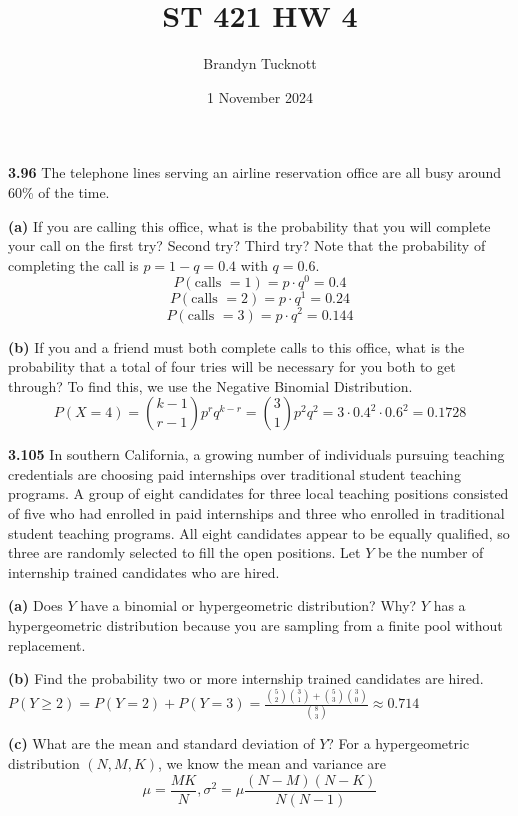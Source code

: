 \documentclass{exam}
\title{ST 421 HW 4}
\author{Brandyn Tucknott}
\date{1 November 2024}
\begin{document}
\maketitle

\begin{questions}
    \textbf{3.96 }
The telephone lines serving an airline reservation office are all busy around 60\% of the time.

\newline
\textbf{(a) } If you are calling this office, what is the probability that you will complete your call on the first try? Second try? Third try?
\sol
Note that the probability of completing the call is $p = 1 - q = 0.4$ with $q = 0.6$.
$$P(\text{calls } = 1) = p \cdot q^0 = 0.4$$
$$P(\text{calls } = 2) = p \cdot q^1 = 0.24$$
$$P(\text{calls } = 3) = p \cdot q^2 = 0.144$$

\newline
\textbf{(b) } If you and a friend must both complete calls to this office, what is the probability that a total of four tries will be necessary for you both to get through?
\sol
To find this, we use the Negative Binomial Distribution.
$$P(X = 4) = \binom{k - 1}{r - 1}p^rq^{k-r} = \binom{3}{1}p^2q^2 = 3 \cdot 0.4^2 \cdot 0.6^2 = 0.1728$$

\newpage
\textbf{3.105 }
In southern California, a growing number of individuals pursuing teaching credentials are choosing paid internships over traditional student teaching programs. A group of eight candidates for three local teaching positions consisted of five who had enrolled in paid internships and three who enrolled in traditional student teaching programs. All eight candidates appear to be equally qualified, so three are randomly selected to fill the open positions. Let $Y$ be the number of internship trained candidates who are hired.

\newline

\textbf{(a) } Does $Y$ have a binomial or hypergeometric distribution? Why?
\sol
$Y$ has a hypergeometric distribution because you are sampling from a finite pool without replacement.

\newline
\textbf{(b) } Find the probability two or more internship trained candidates are hired.
\sol
$P(Y \geq 2) = P(Y = 2) + P(Y = 3) = \frac{\binom{5}{2}\binom{3}{1} + \binom{5}{3}\binom{3}{0}}{\binom{8}{3}} \approx 0.714$

\textbf{(c) } What are the mean and standard deviation of $Y$?
\sol
For a hypergeometric distribution $(N, M, K)$, we know the mean and variance are 
$$\mu = \frac{MK}{N}, \sigma^2 = \mu\frac{(N - M)(N - K)}{N(N - 1)}$$


\end{questions}
\end{document}
